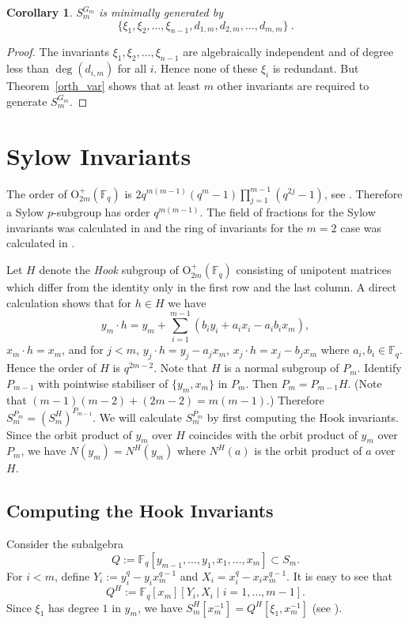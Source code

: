 \documentclass{amsart}
\newcommand{\field}{\mathbb{F}}
\newcommand{\orthp}[2]{{{\text{O}^{+}_{{#1}}(\field_{#2})}}}
\newcommand{\invring}{S_m^{G_m}}
\newtheorem{cor}[subsection]{Corollary}
\begin{document}
\begin{cor}\label{orthogonal minimality}
    $\invring$ is minimally generated by 
    $$\{\xi_1,\xi_2,\dots,\xi_{n-1},d_{1,m},d_{2,m},\dots,d_{m,m}\}\ .$$
\end{cor}

\begin{proof}
    The invariants $\xi_1,\xi_2,\dots,\xi_{n-1}$ are algebraically independent 
and of degree less than $\deg (d_{i,m})$ for all $i$.  Hence none of these $\xi_{i}$
is redundant.  But Theorem~\ref{orth_var} shows that at least $m$ other invariants 
are required to generate $\invring$.
\end{proof}



\section{Sylow Invariants} \label{sylow_section}
The order of $\orthp{2m}{q}$ is $2q^{m(m-1)}(q^m-1)\prod_{j=1}^{m-1}(q^{2j}-1)$,
see \cite[page 141]{taylor-classicalgroups:92}. 
Therefore a Sylow $p$-subgroup has order $q^{m(m-1)}$.
The field of fractions for the Sylow invariants was calculated in 
\cite{Ferreira+Fleischmann-fields:16}
 and the ring of invariants for the $m=2$ case was calculated in \cite{Ferreira+Fleischmann-rings:17}.

Let $H$ denote the {\it Hook} subgroup of $\orthp{2m}{q}$ consisting of unipotent matrices which differ from the identity only in the first row and the last column.
A direct calculation shows that for $h\in H$ we have$$y_m\cdot h= y_m+\sum_{i=1}^{m-1} (b_iy_i+a_ix_i-a_ib_ix_m),$$ $x_m\cdot h=x_m$, and for $j<m$,
  $y_j\cdot h=y_j-a_jx_m$, $x_j\cdot h=x_j-b_jx_m$ where $a_i,b_i\in\field_q$.
Hence the order of $H$ is $q^{2m-2}$. Note that $H$ is a normal subgroup of $P_m$. Identify $P_{m-1}$ with pointwise stabiliser of $\{y_m,x_m\}$ in $P_m$.
Then $P_m=P_{m-1}H$.
(Note that $(m-1)(m-2)+(2m-2)=m(m-1)$.)
Therefore $S_m^{P_m}=(S_m^H)^{P_{m-1}}$.
We will calculate $S_m^{P_m}$ by first computing the Hook invariants. 
Since the orbit product of $y_m$ over $H$ coincides with the orbit product of
 $y_m$ over $P_m$,
we have $N(y_m)=N^H(y_m)$ where $N^H(a)$ is the orbit product of $a$ over $H$.


\subsection{Computing the Hook Invariants} \label{HgroupSec}
Consider the subalgebra $$Q:=\field_q[y_{m-1},\ldots,y_1,x_1,\ldots,x_m]\subset S_m.$$
For $i<m$, define $Y_i:=y_i^q-y_ix_m^{q-1}$ and $X_i=x_i^q-x_ix_m^{q-1}$.
It is easy to see that $$Q^H:=\field_q[x_m][Y_i,X_i\mid i=1,\ldots,m-1].$$
Since $\xi_1$ has degree $1$ in $y_m$, we have $S_m^H[x_m^{-1}]=Q^H[\xi_1,x_m^{-1}]$
(see \cite[Theorem 2.4]{campbell+chuai-local:07}).
\end{document}
